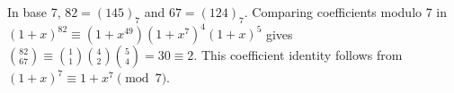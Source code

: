 In base 7, $82=(145)_7$ and $67=(124)_7$. Comparing coefficients modulo 7 in $(1+x)^{82}\equiv(1+x^{49})(1+x^7)^4(1+x)^5$ gives $\binom{82}{67}\equiv\binom11\binom42\binom54=30\equiv\boxed2$. This coefficient identity follows from $(1+x)^7\equiv1+x^7\pmod7$.
